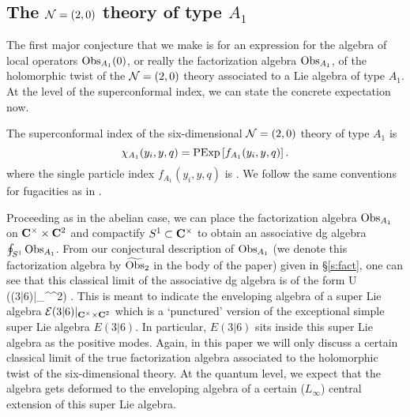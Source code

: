 \subsection*{The $\mathcal N=(2,0)$ theory of type $A_1$} 

The first major conjecture that we make is for an expression for the algebra of local operators $\operatorname{Obs}_{A_1}(0)$, or really the factorization algebra $\operatorname{Obs}_{A_1}$, of the holomorphic twist of the $\mathcal N=(2,0)$ theory associated to a Lie algebra of type $A_1$. 
At the level of the superconformal index, we can state the concrete expectation now. 

\begin{conj}\label{conj:6dtwo}
The superconformal index of the six-dimensional $\mathcal N=(2,0)$ theory of type $A_1$ is 
\[
\chi_{A_1} (y_i,y,q) = {\rm PExp} \left[f_{A_1}(y_i,y,q) \right] .
\]
where the single particle index $f_{A_1}(y_i,y,q)$ is 
\beqn\label{eqn:A1}
.
\eeqn
We follow the same conventions for fugacities as in \cite{Kim:2013nva}. 
\end{conj}



Proceeding as in the abelian case, we can place the factorization algebra $\operatorname{Obs}_{A_1}$ on $\mathbf{C}^\times \times \mathbf{C}^2$ and compactify $S^1 \subset \mathbf{C}^\times$ to obtain an associative dg algebra $\oint_{S^1} \operatorname{Obs}_{A_1}$.
From our conjectural description of $\operatorname{Obs}_{A_1}$ (we denote this factorization algebra by $\widetilde{\operatorname{Obs}}_2$ in the body of the paper) given in \S \ref{s:fact}, one can see that this classical limit of the associative dg algebra is of the form
\beqn
U \left(\cE(3|6)|_{\C^\times \times \C^2}\right) .
\eeqn
This is meant to indicate the enveloping algebra of a super Lie algebra $\mathcal E(3|6)|_{\mathbf{C}^\times \times \mathbf{C}^2}$ which is a `punctured' version of the exceptional simple super Lie algebra $E(3|6)$. 
In particular, $E(3|6)$ sits inside this super Lie algebra as the positive modes.
Again, in this paper we will only discuss a certain classical limit of the true factorization algebra associated to the holomorphic twist of the six-dimensional theory. 
At the quantum level, we expect that the algebra gets deformed to the enveloping algebra of a certain ($L_\infty$) central extension of this super Lie algebra.

